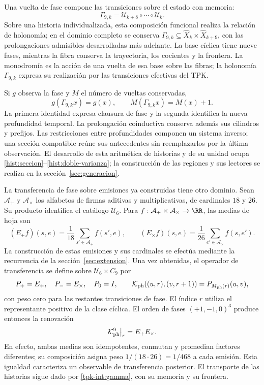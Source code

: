 Una vuelta de fase compone las transiciones sobre el estado con memoria:
\begin{equation}
 \Gamma_{9,k}=\mathcal U_{k+8}\circ\cdots\circ\mathcal U_k.
 \label{tpk-int:gamma}
\end{equation}
Sobre una historia individualizada, esta composición funcional realiza
la relación de holonomía; en el dominio completo se conserva
\(\Gamma_{9,k}\subseteq\widehat X_k\times\widehat X_{k+9}\),
con las prolongaciones admisibles desarrolladas más adelante.
La base cíclica tiene nueve fases, mientras
la fibra conserva la trayectoria, los cocientes y la frontera. La
monodromía es la acción de una vuelta de esa base sobre las fibras; la
holonomía \(\Gamma_{9,k}\) expresa su realización por las transiciones
efectivas del TPK.

Si \(g\) observa la fase y \(M\) el número de vueltas conservadas,
\[
 g(\Gamma_{9,k}x)=g(x),\qquad M(\Gamma_{9,k}x)=M(x)+1.
\]
La primera identidad expresa clausura de fase y la segunda identifica
la nueva profundidad temporal. La prolongación coinductiva conserva
además sus cilindros y prefijos. Las restricciones entre profundidades
componen un sistema inverso; una sección compatible reúne sus
antecedentes sin reemplazarlos por la última observación. El desarrollo
de esta aritmética de historias y de su unidad ocupa
\ref{hist:seccion}--\ref{hist:doble-varianza}; la construcción de las
regiones y sus lectores se realiza en la sección~\ref{sec:generacion}.

La transferencia de fase sobre emisiones ya construidas tiene otro
dominio. Sean \(\mathcal A_+\) y \(\mathcal A_\times\) los
alfabetos de firmas aditivas y multiplicativas, de cardinales \(18\)
y \(26\). Su producto identifica el catálogo \(\mathcal U_6\).
Para \(f:\mathcal A_+\times\mathcal A_\times\to\RR\),
las medias de hoja son
\[
 (E_+f)(s,e)=\frac1{18}\sum_{s'\in\mathcal A_+}f(s',e),\qquad
 (E_\times f)(s,e)=\frac1{26}\sum_{e'\in\mathcal A_\times}f(s,e').
\]
La construcción de estas emisiones y sus cardinales se efectúa mediante
la recurrencia de la sección~\ref{sec:extension}. Una vez obtenidas,
el operador de transferencia se define sobre
\(\mathcal U_6\times C_9\) por
\[
 P_+=E_+,\quad P_-=E_\times,\quad P_0=I,\qquad
 \mathcal K_{\rm ph}((u,r),(v,r+1))=P_{M_{\rm ph}(r)}(u,v),
\]
con peso cero para las restantes transiciones de fase. El índice
\(r\) utiliza el representante positivo de la clase cíclica.
El orden de fases \((+1,-1,0)^3\) produce entonces la renovación
\[
 \mathcal K_{\rm ph}^{9}\big|_r=E_+E_\times.
\]
En efecto, ambas medias son idempotentes, conmutan y promedian factores
diferentes; su composición asigna peso \(1/(18\cdot26)=1/468\)
a cada emisión. Esta igualdad caracteriza un observable de transferencia
posterior. El transporte de las historias sigue dado por
\eqref{tpk-int:gamma}, con su memoria y su frontera.

